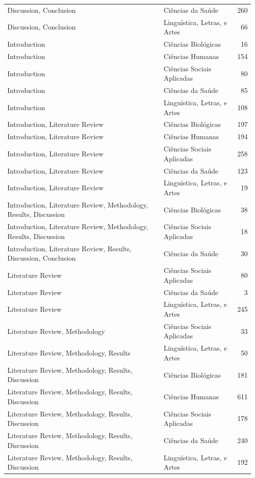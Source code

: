 \begin{longtable}{llr}
Discussion, Conclusion & Ciências da Saúde & 260 \\
Discussion, Conclusion & Linguística, Letras, e Artes & 66 \\
Introduction & Ciências Biológicas & 16 \\
Introduction & Ciências Humanas & 154 \\
Introduction & Ciências Sociais Aplicadas & 80 \\
Introduction & Ciências da Saúde & 85 \\
Introduction & Linguística, Letras, e Artes & 108 \\
Introduction, Literature Review & Ciências Biológicas & 197 \\
Introduction, Literature Review & Ciências Humanas & 194 \\
Introduction, Literature Review & Ciências Sociais Aplicadas & 258 \\
Introduction, Literature Review & Ciências da Saúde & 123 \\
Introduction, Literature Review & Linguística, Letras, e Artes & 19 \\
Introduction, Literature Review, Methodology, Results, Discussion & Ciências Biológicas & 38 \\
Introduction, Literature Review, Methodology, Results, Discussion & Ciências Sociais Aplicadas & 18 \\
Introduction, Literature Review, Results, Discussion, Conclusion & Ciências da Saúde & 30 \\
Literature Review & Ciências Sociais Aplicadas & 80 \\
Literature Review & Ciências da Saúde & 3 \\
Literature Review & Linguística, Letras, e Artes & 245 \\
Literature Review, Methodology & Ciências Sociais Aplicadas & 33 \\
Literature Review, Methodology, Results & Linguística, Letras, e Artes & 50 \\
Literature Review, Methodology, Results, Discussion & Ciências Biológicas & 181 \\
Literature Review, Methodology, Results, Discussion & Ciências Humanas & 611 \\
Literature Review, Methodology, Results, Discussion & Ciências Sociais Aplicadas & 178 \\
Literature Review, Methodology, Results, Discussion & Ciências da Saúde & 240 \\
Literature Review, Methodology, Results, Discussion & Linguística, Letras, e Artes & 192 \\

\end{longtable}
